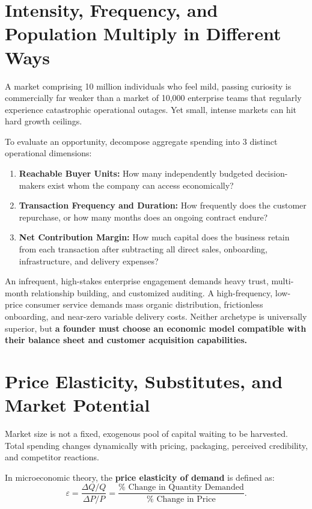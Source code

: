\section{Intensity, Frequency, and Population Multiply in Different Ways}

A market comprising 10 million individuals who feel mild, passing curiosity is commercially far weaker than a market of 10,000 enterprise teams that regularly experience catastrophic operational outages. Yet small, intense markets can hit hard growth ceilings.

To evaluate an opportunity, decompose aggregate spending into 3 distinct operational dimensions:
\begin{enumerate}[leftmargin=12pt,itemsep=2pt,topsep=1pt,parsep=0pt]
  \item \textbf{Reachable Buyer Units:} How many independently budgeted decision-makers exist whom the company can access economically?
  \item \textbf{Transaction Frequency and Duration:} How frequently does the customer repurchase, or how many months does an ongoing contract endure?
  \item \textbf{Net Contribution Margin:} How much capital does the business retain from each transaction after subtracting all direct sales, onboarding, infrastructure, and delivery expenses?
\end{enumerate}

An infrequent, high-stakes enterprise engagement demands heavy trust, multi-month relationship building, and customized auditing. A high-frequency, low-price consumer service demands mass organic distribution, frictionless onboarding, and near-zero variable delivery costs. Neither archetype is universally superior, but \textbf{a founder must choose an economic model compatible with their balance sheet and customer acquisition capabilities.}

\section{Price Elasticity, Substitutes, and Market Potential}

Market size is not a fixed, exogenous pool of capital waiting to be harvested. Total spending changes dynamically with pricing, packaging, perceived credibility, and competitor reactions.

In microeconomic theory, the \textbf{price elasticity of demand} is defined as:
\begin{equation}
\label{eq:elasticity}
\varepsilon = \frac{\Delta Q / Q}{\Delta P / P} = \frac{\% \text{ Change in Quantity Demanded}}{\% \text{ Change in Price}}.
\end{equation}

